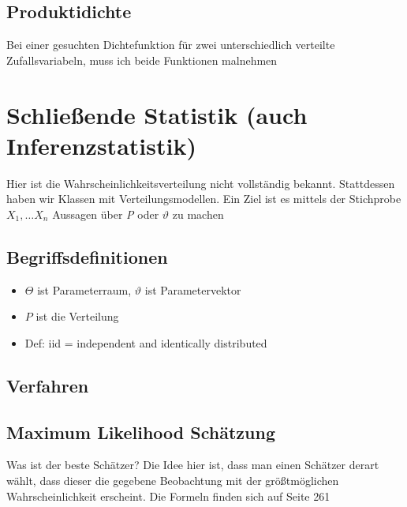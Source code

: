 \documentclass[10pt,a4paper]{article}
\begin{document}
	\subsection{Produktidichte}
	Bei einer gesuchten Dichtefunktion für zwei unterschiedlich verteilte Zufallsvariabeln, muss ich beide Funktionen malnehmen
	\section{Schließende Statistik (auch Inferenzstatistik)}
	Hier ist die Wahrscheinlichkeitsverteilung nicht vollständig bekannt. Stattdessen haben wir Klassen mit Verteilungsmodellen. Ein Ziel ist es mittels der Stichprobe $X_1,\dots X_n$ Aussagen über \textit{P} oder $\vartheta$ zu machen\\
	\subsection{Begriffsdefinitionen}
	\begin{itemize}
		\item $\Theta$ ist Parameterraum, $\vartheta$ ist Parametervektor
		\item $P$ ist die Verteilung
		\item Def: iid = independent and identically distributed
	\end{itemize}
\subsection{Verfahren}
\subsection{Maximum Likelihood Schätzung}
Was ist der beste Schätzer? Die Idee hier ist, dass man einen Schätzer derart wählt, dass dieser die gegebene Beobachtung mit der größtmöglichen Wahrscheinlichkeit erscheint. Die Formeln finden sich auf Seite 261
\end{document}
